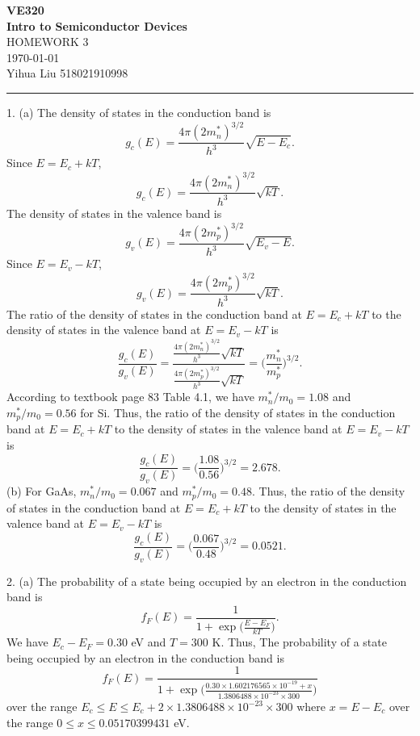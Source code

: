\documentclass[a4paper]{article}
\begin{document}
\begin{center}
\huge
\textbf{VE320\\Intro to Semiconductor Devices\\}
\Large
\vspace{30pt}
\uppercase{Homework 3}\\
\vspace{5pt}\today\\
\vspace{5pt}
Yihua Liu 518021910998
\vspace{5pt}
\rule[-10pt]{.97\linewidth}{0.05em}
\end{center}
1. (a) The density of states in the conduction band is
$$g_c(E)=\frac{4\pi(2m_n^*)^{3/2}}{h^3}\sqrt{E-E_c}.$$
Since $E=E_c+kT$,
$$g_c(E)=\frac{4\pi(2m_n^*)^{3/2}}{h^3}\sqrt{kT}.$$
The density of states in the valence band is
$$g_v(E)=\frac{4\pi(2m_p^*)^{3/2}}{h^3}\sqrt{E_v-E}.$$
Since $E=E_v-kT$,
$$g_v(E)=\frac{4\pi(2m_p^*)^{3/2}}{h^3}\sqrt{kT}.$$
The ratio of the density of states in the conduction band at $E=E_c+kT$ to the density of states in the valence band at $E=E_v-kT$ is
$$\frac{g_c(E)}{g_v(E)}=\frac{\frac{4\pi(2m_n^*)^{3/2}}{h^3}\sqrt{kT}}{\frac{4\pi(2m_p^*)^{3/2}}{h^3}\sqrt{kT}}=\bigg(\frac{m_n^*}{m_p^*}\bigg)^{3/2}.$$
According to textbook page 83 Table 4.1, we have $m_n^*/m_0=1.08$ and $m_p^*/m_0=0.56$ for Si. Thus, the ratio of the density of states in the conduction band at $E=E_c+kT$ to the density of states in the valence band at $E=E_v-kT$ is
$$\frac{g_c(E)}{g_v(E)}=\bigg(\frac{1.08}{0.56}\bigg)^{3/2}=2.678.$$
(b) For GaAs, $m_n^*/m_0=0.067$ and $m_p^*/m_0=0.48$. Thus, the ratio of the density of states in the conduction band at $E=E_c+kT$ to the density of states in the valence band at $E=E_v-kT$ is
$$\frac{g_c(E)}{g_v(E)}=\bigg(\frac{0.067}{0.48}\bigg)^{3/2}=0.0521.$$

2. (a) The probability of a state being occupied by an electron in the conduction band is
$$f_F(E)=\frac{1}{1+\exp{\big(\frac{E-E_F}{kT}\big)}}.$$
We have $E_c-E_F=0.30$ eV and $T=300$ K. Thus, The probability of a state being occupied by an electron in the conduction band is
$$f_F(E)=\frac{1}{1+\exp{\big(\frac{0.30\times1.602176565\times10^{-19}+x}{1.3806488\times10^{-23}\times300}\big)}}$$
over the range $E_c\leq E\leq E_c+2\times1.3806488\times10^{-23}\times300$ where $x=E-E_c$ over the range $0\leq x\leq0.05170399431$ eV.
\end{document}
